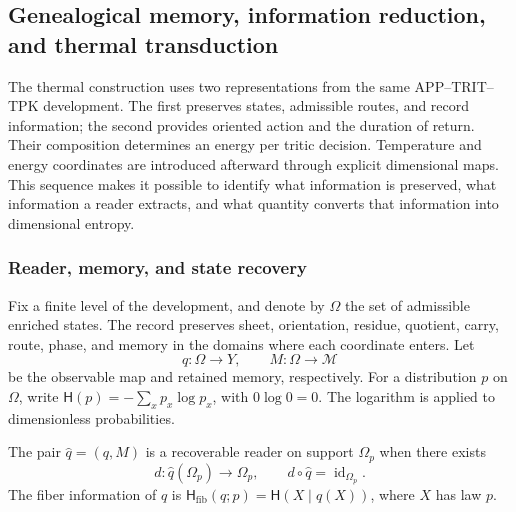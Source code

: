 
\subsection{Genealogical memory, information reduction, and thermal transduction}
\label{sec:ii-kb-aut-desarrollo}

The thermal construction uses two representations from the same
APP--TRIT--TPK development. The first preserves states, admissible routes,
and record information; the second provides oriented action
and the duration of return. Their composition determines an energy per
tritic decision. Temperature and energy coordinates are introduced
afterward through explicit dimensional maps. This sequence
makes it possible to identify what information is preserved, what information a reader
extracts, and what quantity converts that information into dimensional entropy.

\subsubsection{Reader, memory, and state recovery}

Fix a finite level of the development, and denote by \(\Omega\) the
set of admissible enriched states. The record preserves sheet,
orientation, residue, quotient, carry, route, phase, and memory in the
domains where each coordinate enters. Let
\[
 q:\Omega\longrightarrow Y,\qquad
 M:\Omega\longrightarrow\mathcal M
\]
be the observable map and retained memory, respectively. For a
distribution \(p\) on \(\Omega\), write
\(\mathsf H(p)=-\sum_xp_x\log p_x\), with \(0\log0=0\).
The logarithm is applied to dimensionless probabilities.

\begin{definition}
The pair \(\widehat q=(q,M)\) is a recoverable reader on support
\(\Omega_p\) when there exists
\[
 d:\widehat q(\Omega_p)\longrightarrow\Omega_p,
 \qquad d\circ\widehat q=\operatorname{id}_{\Omega_p}.
\]
The fiber information of \(q\) is
\(\mathsf H_{\mathrm{fib}}(q;p)=\mathsf H(X\mid q(X))\), where
\(X\) has law \(p\).
\end{definition}

